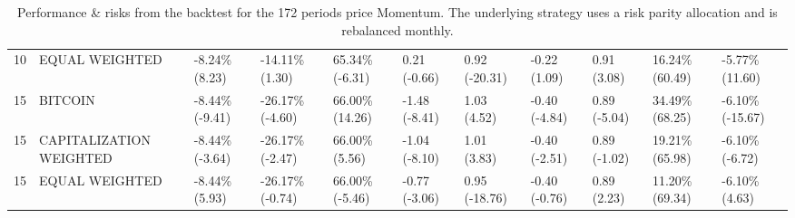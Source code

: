 \documentclass{article}
\begin{document}
\begin{landscape}
\begin{table}[H]
\begin{tabular}{p{0.4cm}|p{3cm}|p{1.65cm}|p{1.65cm}|p{1.65cm}|p{1.65cm}|p{1.65cm}|p{1.65cm}|p{1.65cm}|p{1.65cm}|p{1.65cm}}
\\ 
10&EQUAL WEIGHTED&-8.24\% (8.23)&-14.11\% (1.30)&65.34\% (-6.31)&0.21 (-0.66)&0.92 (-20.31)&-0.22 (1.09)&0.91 (3.08)&16.24\% (60.49)&-5.77\% (11.60)
\\ 
15&BITCOIN&-8.44\% (-9.41)&-26.17\% (-4.60)&66.00\% (14.26)&-1.48 (-8.41)&1.03 (4.52)&-0.40 (-4.84)&0.89 (-5.04)&34.49\% (68.25)&-6.10\% (-15.67)
\\ 
15&CAPITALIZATION WEIGHTED&-8.44\% (-3.64)&-26.17\% (-2.47)&66.00\% (5.56)&-1.04 (-8.10)&1.01 (3.83)&-0.40 (-2.51)&0.89 (-1.02)&19.21\% (65.98)&-6.10\% (-6.72)
\\ 
15&EQUAL WEIGHTED&-8.44\% (5.93)&-26.17\% (-0.74)&66.00\% (-5.46)&-0.77 (-3.06)&0.95 (-18.76)&-0.40 (-0.76)&0.89 (2.23)&11.20\% (69.34)&-6.10\% (4.63)\\
\bottomrule
  \end{tabular}
  \label{tab:mom172riskparity}
   \caption{Performance \& risks from the backtest for the 172 periods price Momentum. The underlying strategy uses a risk parity allocation and is rebalanced monthly.}
\end{table}
\end{landscape}
\end{document}
